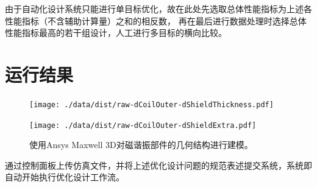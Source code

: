 \documentclass[index]{subfiles}
\begin{document}
由于自动化设计系统只能进行单目标优化，故在此处先选取总体性能指标为上述各性能指标（不含辅助计算量）之和的相反数，
再在最后进行数据处理时选择总体性能指标最高的若干组设计，人工进行多目标的横向比较。

\section{运行结果}
\begin{figure}[p]
  \centering%
    {\texttt{[image: ./data/dist/raw-dCoilOuter-dShieldThickness.pdf]}}\par
    {\texttt{[image: ./data/dist/raw-dCoilOuter-dShieldExtra.pdf]}}
  \caption[几何模型的搭建]{使用Ansys Maxwell 3D对磁谐振部件的几何结构进行建模。}
\end{figure}
通过控制面板上传仿真文件，并将上述优化设计问题的规范表述提交系统，系统即自动开始执行优化设计工作流。
\end{document}
